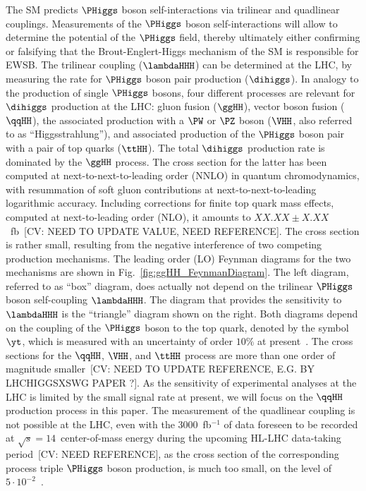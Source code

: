The SM predicts $\PHiggs$ boson self-interactions via trilinear and quadlinear couplings. 
Measurements of the $\PHiggs$ boson self-interactions will allow to determine the potential of the $\PHiggs$ field,
thereby ultimately either confirming or falsifying that the Brout-Englert-Higgs mechanism of the SM is responsible for EWSB.
The trilinear coupling ($\lambdaHHH$) can be determined at the LHC, by measuring the rate for $\PHiggs$ boson pair production ($\dihiggs$). 
In analogy to the production of single $\PHiggs$ bosons, 
four different processes are relevant for $\dihiggs$ production at the LHC: 
gluon fusion ($\ggHH$), vector boson fusion ($\qqHH$), the associated production with a $\PW$ or $\PZ$ boson ($\VHH$, also referred to as ``Higgsstrahlung''),
and associated production of the $\PHiggs$ boson pair with a pair of top quarks ($\ttHH$).
The total $\dihiggs$ production rate is dominated by the $\ggHH$ process.
The cross section for the latter has been computed at next-to-next-to-leading order (NNLO) in quantum chromodynamics,
with resummation of soft gluon contributions at next-to-next-to-leading logarithmic accuracy.
Including corrections for finite top quark mass effects, computed at next-to-leading order (NLO),
it amounts to $XX.XX \pm X.XX$~fb~\cite{}[CV: NEED TO UPDATE VALUE, NEED REFERENCE].
The cross section is rather small, resulting from the negative interference of two competing production mechanisms.
The leading order (LO) Feynman diagrams for the two mechanisms are shown in Fig.~\ref{fig:ggHH_FeynmanDiagram}.
The left diagram, referred to as ``box'' diagram, does actually not depend on the trilinear $\PHiggs$ boson self-coupling $\lambdaHHH$.
The diagram that provides the sensitivity to $\lambdaHHH$ is the ``triangle'' diagram shown on the right.
Both diagrams depend on the coupling of the $\PHiggs$ boson to the top quark, denoted by the symbol $\yt$,
which is measured with an uncertainty of order $10\%$ at present~\cite{Aaboud:2018urx,HIG-17-035}.
The cross sections for the $\qqHH$, $\VHH$, and $\ttHH$ process are more than one order of magnitude smaller~\cite{Baglio:2012np}[CV: NEED TO UPDATE REFERENCE, E.G. BY LHCHIGGSXSWG PAPER ?].
As the sensitivity of experimental analyses at the LHC is limited by the small signal rate at present,
we will focus on the $\qqHH$ production process in this paper.
The measurement of the quadlinear coupling is not possible at the LHC, 
even with the $3000$~fb$^{-1}$ of data foreseen to be recorded at $\sqrt{s}=14$~\TeV center-of-mass energy during the upcoming HL-LHC data-taking period~\cite{}[CV: NEED REFERENCE],
as the cross section of the corresponding process triple $\PHiggs$ boson production, is much too small, 
on the level of $5 \cdot 10^{-2}$~\cite{Plehn:2005nk,Binoth:2006ym}.

